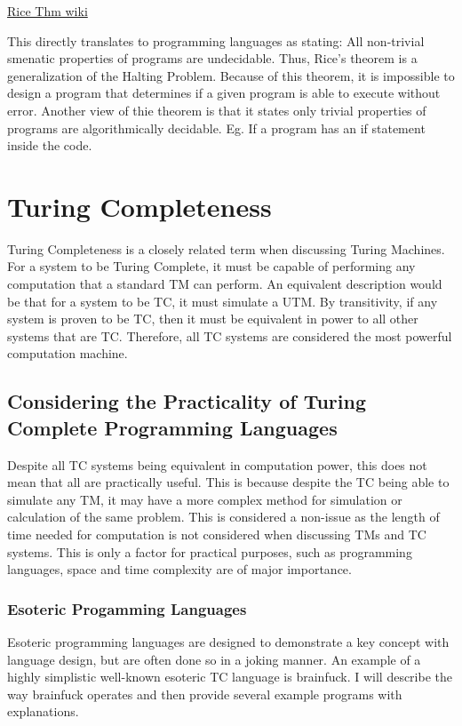 \href{https://en.wikipedia.org/wiki/Rice\%27s_theorem}{Rice Thm wiki}

This directly translates to programming languages as stating: All non-trivial smenatic properties of programs are undecidable.
Thus, Rice's theorem is a generalization of the Halting Problem.
Because of this theorem, it is impossible to design a program that determines if a given program is able to execute without error.
Another view of thie theorem is that it states only trivial properties of programs are algorithmically decidable.
Eg. If a program has an if statement inside the code.

\section{Turing Completeness}\label{sec:TC}

Turing Completeness is a closely related term when discussing Turing Machines.
For a system to be Turing Complete, it must be capable of performing any computation that a standard TM can perform.
An equivalent description would be that for a system to be TC, it must simulate a UTM.
By transitivity, if any system is proven to be TC, then it must be equivalent in power to all other systems that are TC.
Therefore, all TC systems are considered the most powerful computation machine.

\subsection{Considering the Practicality of Turing Complete Programming Languages}\label{subsec:PracticalTC}

Despite all TC systems being equivalent in computation power, this does not mean that all are practically useful.
This is because despite the TC being able to simulate any TM, it may have a more complex method for simulation or calculation of the same problem.
This is considered a non-issue as the length of time needed for computation is not considered when discussing TMs and TC systems.
This is only a factor for practical purposes, such as programming languages, space and time complexity are of major importance.

\subsubsection{Esoteric Progamming Languages}\label{subsubsec:EsotericPL}

Esoteric programming languages are designed to demonstrate a key concept with language design, but are often done so in a joking manner.
An example of a highly simplistic well-known esoteric TC language is brainfuck.
I will describe the way brainfuck operates and then provide several example programs with explanations.

